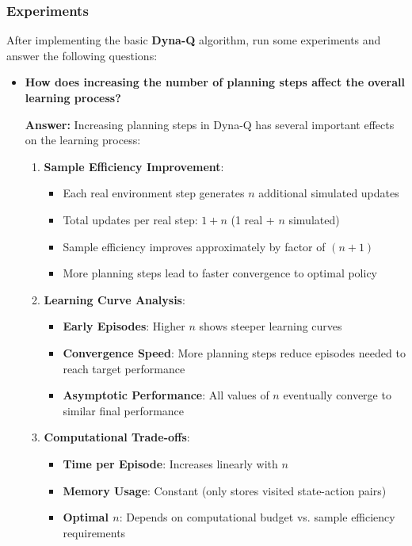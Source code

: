 \subsubsection{Experiments}
After implementing the basic \textbf{Dyna-Q} algorithm, run some experiments and answer the following questions:
\begin{itemize} 
    \item \textbf{How does increasing the number of planning steps affect the overall learning process?}
    
    \textbf{Answer:} Increasing planning steps in Dyna-Q has several important effects on the learning process:
    
    \begin{enumerate}
        \item \textbf{Sample Efficiency Improvement}:
        \begin{itemize}
            \item Each real environment step generates $n$ additional simulated updates
            \item Total updates per real step: $1 + n$ (1 real + $n$ simulated)
            \item Sample efficiency improves approximately by factor of $(n+1)$
            \item More planning steps lead to faster convergence to optimal policy
        \end{itemize}
        
        \item \textbf{Learning Curve Analysis}:
        \begin{itemize}
            \item \textbf{Early Episodes}: Higher $n$ shows steeper learning curves
            \item \textbf{Convergence Speed}: More planning steps reduce episodes needed to reach target performance
            \item \textbf{Asymptotic Performance}: All values of $n$ eventually converge to similar final performance
        \end{itemize}
        
        \item \textbf{Computational Trade-offs}:
        \begin{itemize}
            \item \textbf{Time per Episode}: Increases linearly with $n$
            \item \textbf{Memory Usage}: Constant (only stores visited state-action pairs)
            \item \textbf{Optimal $n$}: Depends on computational budget vs. sample efficiency requirements
        \end{itemize}
        

\end{enumerate}
\end{itemize}
